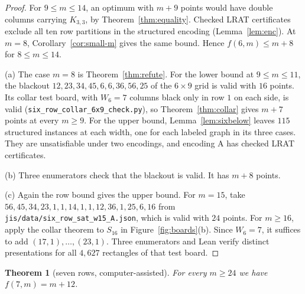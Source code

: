 \documentclass[12pt]{article}
\theoremstyle{plain}
\newtheorem{theorem}{Theorem}
\theoremstyle{definition}
\theoremstyle{remark}
\begin{document}
\begin{proof}
For $9\le m\le14$, an optimum with $m+9$ points would have double
columns carrying $K_{3,3}$, by Theorem~\ref{thm:equality}.
Checked LRAT certificates exclude all ten row partitions in the
structured encoding (Lemma~\ref{lem:enc}).
At $m=8$, Corollary~\ref{cor:small-m} gives the same bound.
Hence $f(6,m)\le m+8$ for $8\le m\le14$.

(a) The case $m=8$ is Theorem~\ref{thm:refute}. For the lower bound at $9\le m\le11$, the
blackout $12,\allowbreak 23,\allowbreak 34,\allowbreak 45,\allowbreak 6,\allowbreak 6,\allowbreak 36,\allowbreak 56,\allowbreak 25$ of the $6\times9$ grid is valid with $16$ points. Its
collar test board, with $W_6=7$ columns black only in row $1$ on each side, is valid
(\nolinkurl{six_row_collar_6x9_check.py}), so Theorem~\ref{thm:collar} gives $m+7$ points at every
$m\ge9$. For the upper bound, Lemma~\ref{lem:sixbelow} leaves $115$ structured instances at each
width, one for each labeled graph in its three cases. They are unsatisfiable under two
encodings, and encoding A has checked LRAT certificates.

(b) Three enumerators check that the blackout is valid. It has $m+8$ points.

(c) Again the row bound gives the upper bound. For $m=15$, take
$56,\allowbreak 45,\allowbreak 34,\allowbreak 23,\allowbreak 1,\allowbreak 1,\allowbreak 14,\allowbreak 1,\allowbreak 1,\allowbreak 12,\allowbreak 36,\allowbreak 1,\allowbreak 25,\allowbreak 6,\allowbreak 16$
from \nolinkurl{jis/data/six_row_sat_w15_A.json}, which is valid with
$24$ points. For $m\ge16$, apply the collar theorem to $S_{16}$ in
Figure~\ref{fig:boards}(b). Since $W_6=7$, it suffices to add
$(17,1),\dots,(23,1)$. Three enumerators and Lean verify distinct
presentations for all $4{,}627$ rectangles of that test board.
\end{proof}

\begin{theorem}[seven rows, computer-assisted]\label{thm:sevenrow}
For every $m\ge24$ we have $f(7,m)=m+12$.
\end{theorem}
\end{document}
